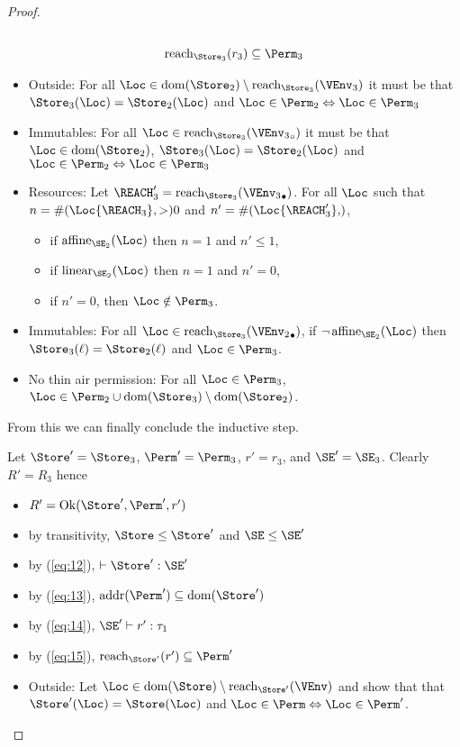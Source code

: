 \begin{proof}
\begin{gather}
    \\\label{eq:15}
    \Reach{\Store_3}{r_3} \subseteq \Perm_3
  \end{gather}
  \begin{itemize}
  \item Outside: For all $\Loc \in \Dom{\Store_2} \setminus
    \Reach{\Store_3}{\VEnv_3}$ it must be that
    $\Store_3(\Loc) = \Store_2 (\Loc)$
    and $\Loc\in\Perm_2 \Leftrightarrow \Loc\in\Perm_3$
  \item Immutables: For all $\Loc \in
    \Reach{\Store_3}{\ImmutableBorrows{\VEnv_3}}$ it must be that
    $\Loc\in\Dom{\Store_2}$,
    $\Store_3 (\Loc) = \Store_2 (\Loc)$
    and $\Loc\in{\Perm_2} \Leftrightarrow \Loc\in\Perm_3$
  \item Resources:
    Let $\REACH_3' =\Reach{\Store_3}{\Active{\VEnv_3}}$.
    For all $\Loc$ such that $n= \MultiNumber\Loc{\REACH_3} >0$ and $n' =
    \MultiNumber\Loc{\REACH_3'}$,
    \begin{itemize}
    \item if $\Affine{\SE_2}\Loc$ then $n=1$ and $n'\le 1$,
    \item if $\Linear{\SE_2}\Loc$ then $n=1$ and $n' = 0$,
    \item if $n'=0$, then $\Loc\notin\Perm_3$.
    \end{itemize}
  \item Immutables: For all $\Loc \in \Reach
    {\Store_3}{\Active{\VEnv_2}}$, if $\neg\Writeable{\SE_2}\Loc$ then
    $\Store_3 (\ell) = \Store_2 (\ell)$ and $\Loc\in \Perm_3$.
  \item No thin air permission: For all $\Loc\in \Perm_3$, $\Loc
    \in \Perm_2 \cup  \Dom{\Store_3} \setminus \Dom{\Store_2}$.
  \end{itemize}
  From this we can finally conclude the inductive step.

  Let $\Store' = \Store_3$, $\Perm' = \Perm_3$, $r' = r_3$, and $\SE'
  = \SE_3$. Clearly $R' = R_3$ hence
  \begin{itemize}
  \item $R' = \Ok{\Store', \Perm', r'}$
  \item by transitivity, $\Store \le \Store'$ and $\SE \le \SE'$
  \item by (\ref{eq:12}), $\vdash \Store' : \SE'$
  \item by (\ref{eq:13}), $\Addresses{\Perm'} \subseteq \Dom{\Store'}$
  \item by (\ref{eq:14}), $\SE' \vdash r' : \tau_1$
  \item by (\ref{eq:15}), $\Reach{\Store'}{r'} \subseteq \Perm'$
  \item Outside: Let $\Loc \in \Dom{\Store} \setminus
    \Reach{\Store'}{\VEnv}$ and show that that
    $\Store' (\Loc) = \Store (\Loc)$
    and $\Loc\in\Perm \Leftrightarrow \Loc\in\Perm'$.


\end{itemize}
\end{proof}
